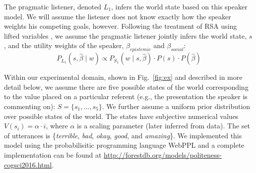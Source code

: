 \documentclass[10pt,letterpaper]{article}
\newcommand{\denote}[1]{\mbox{ $[\![ #1 ]\!]$}}
\newcommand{\mht}[1]{\textcolor{DarkOrange}{[mht: #1]}}
\newcommand{\ejy}[1]{\textcolor{Blue}{[ejy: #1]}}
\begin{document}
The pragmatic listener, denoted $L_1$, infers the world state based on this speaker model.
We will assume the listener does not know exactly how the speaker weights his competing goals, however.
Following the treatment of RSA using lifted variables \cite{GoodmanLassiter2015, bergen2016, Kao2014},
we assume the pragmatic listener jointly infers the world state, $s$, and the utility weights of the speaker, $\beta_{epistemic}$ and $\beta_{social}$:
\begin{equation}
P_{L_1}(s,  \hat{\beta} \mid w)\propto P_{S_1}(w \mid s,  \hat{\beta})\cdot P(s) \cdot P( \hat{\beta}) \label{eq:L1}
\end{equation}

%

Within our experimental domain, shown in Fig.~\ref{fig:ex} and described in more detail below, we assume there are five possible states of the world corresponding to the value placed on a particular referent (e.g., the presentation the speaker is commenting on): $S = \{s_{1}, ...,  s_{5}\}$.
We further assume a uniform prior distribution over possible states of the world.
The states have subjective numerical values $V(s_{i}) = \alpha \cdot i$, where $\alpha$ is a scaling parameter (later inferred from data).
The set of utterances is \{\emph{terrible}, \emph{bad}, \emph{okay}, \emph{good}, and \emph{amazing}\}.
We implemented this model using the probabilisitic programming language WebPPL \cite{dippl} and a complete implementation can be found at \url{http://forestdb.org/models/politeness-cogsci2016.html}.
\end{document}
